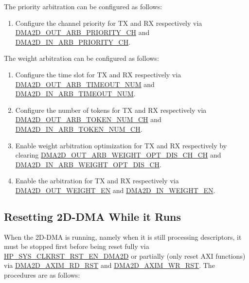 \documentclass[main\_\_EN.tex]{subfiles}
\begin{document}
The priority arbitration can be configured as follows:
\begin{enumerate}
    \item Configure the channel priority for TX and RX respectively via \hyperref[fielddesc:DMA2DOUTARBPRIORITYCHN]{DMA2D\_OUT\_ARB\_PRIORITY\_CH} and \hyperref[fielddesc:DMA2DINARBPRIORITYCHN]{DMA2D\_IN\_ARB\_PRIORITY\_CH}.
\end{enumerate}

The weight arbitration can be configured as follows:
\begin{enumerate}
    \item Configure the time slot for TX and RX respectively via \hyperref[fielddesc:DMA2DOUTARBTIMEOUTNUM]{DMA2D\_OUT\_ARB\_TIMEOUT\_NUM} and \hyperref[fielddesc:DMA2DINARBTIMEOUTNUM]{DMA2D\_IN\_ARB\_TIMEOUT\_NUM}.
    \item Configure the number of tokens for TX and RX respectively via \hyperref[fielddesc:DMA2DOUTARBTOKENNUMCHN]{DMA2D\_OUT\_ARB\_TOKEN\_NUM\_CH} and \hyperref[fielddesc:DMA2DINARBTOKENNUMCHN]{DMA2D\_IN\_ARB\_TOKEN\_NUM\_CH}.
    \item Enable weight arbitration optimization for TX and RX respectively by clearing \hyperref[fielddesc:DMA2DOUTARBWEIGHTOPTDISCHN]{DMA2D\_OUT\_ARB\_WEIGHT\_OPT\_DIS\_CH\_CH} and \hyperref[fielddesc:DMA2DINARBWEIGHTOPTDISCHN]{DMA2D\_IN\_ARB\_WEIGHT\_OPT\_DIS\_CH}.
    \item Enable the arbitration for TX and RX respectively via \hyperref[fielddesc:DMA2DOUTWEIGHTEN]{DMA2D\_OUT\_WEIGHT\_EN} and \hyperref[fielddesc:DMA2DINWEIGHTEN]{DMA2D\_IN\_WEIGHT\_EN}.
\end{enumerate}


\subsection{Resetting 2D-DMA While it Runs}

When the 2D-DMA is running, namely when it is still processing descriptors, it must be stopped first before being reset fully via \hyperref[fielddesc:HPSYSCLKRSTRSTENDMA2D]{HP\_SYS\_CLKRST\_RST\_EN\_DMA2D} or partially (only reset AXI functions) via \hyperref[fielddesc:DMA2DAXIMRDRST]{DMA2D\_AXIM\_RD\_RST} and \hyperref[fielddesc:DMA2DAXIMWRRST]{DMA2D\_AXIM\_WR\_RST}. The procedures are as follows:
\end{document}
